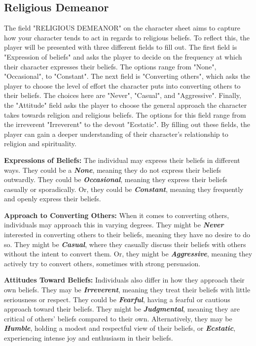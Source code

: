 \documentclass[12pt]{book}
\begin{document}
\subsection{\textbf{Religious Demeanor}}

The field "RELIGIOUS DEMEANOR" on the character sheet aims to capture how your character tends to act in regards to religious beliefs. To reflect this, the player will be presented with three different fields to fill out. The first field is "Expression of beliefs" and asks the player to decide on the frequency at which their character expresses their beliefs. The options range from "None", "Occasional", to "Constant". The next field is "Converting others", which asks the player to choose the level of effort the character puts into converting others to their beliefs. The choices here are "Never", "Casual", and "Aggressive". Finally, the "Attitude" field asks the player to choose the general approach the character takes towards religion and religious beliefs. The options for this field range from the irreverent "Irreverent" to the devout "Ecstatic". By filling out these fields, the player can gain a deeper understanding of their character's relationship to religion and spirituality.

\textbf{Expressions of Beliefs:} The individual may express their beliefs in different ways. They could be a \textbf{\textit{None}}, meaning they do not express their beliefs outwardly. They could be \textbf{\textit{Occasional}}, meaning they express their beliefs casually or sporadically. Or, they could be \textbf{\textit{Constant}}, meaning they frequently and openly express their beliefs.

\textbf{Approach to Converting Others:} When it comes to converting others, individuals may approach this in varying degrees. They might be \textbf{\textit{Never}} interested in converting others to their beliefs, meaning they have no desire to do so. They might be \textbf{\textit{Casual}}, where they casually discuss their beliefs with others without the intent to convert them. Or, they might be \textbf{\textit{Aggressive}}, meaning they actively try to convert others, sometimes with strong persuasion.

\textbf{Attitudes Toward Beliefs:} Individuals also differ in how they approach their own beliefs. They may be \textbf{\textit{Irreverent}}, meaning they treat their beliefs with little seriousness or respect. They could be \textbf{\textit{Fearful}}, having a fearful or cautious approach toward their beliefs. They might be \textbf{\textit{Judgmental}}, meaning they are critical of others’ beliefs compared to their own. Alternatively, they may be \textbf{\textit{Humble}}, holding a modest and respectful view of their beliefs, or \textbf{\textit{Ecstatic}}, experiencing intense joy and enthusiasm in their beliefs.
\end{document}
